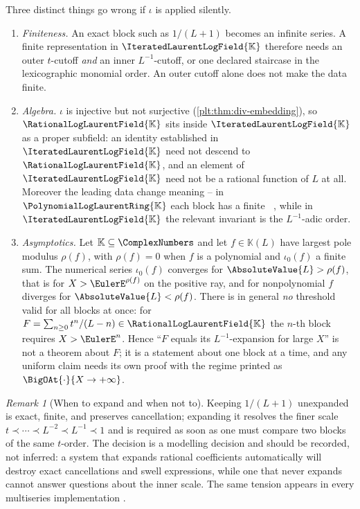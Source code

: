 \documentclass[11pt,oneside]{article}
\theoremstyle{plain}
\theoremstyle{definition}
\theoremstyle{remark}
\newtheorem{remark}[theorem]{Remark}
\newcommand{\K}{\mathbb{K}}
\newcommand{\PLlau}{\PolynomialLogLaurentRing{\K}}       %
\newcommand{\PLrat}{\RationalLogLaurentField{\K}}        %
\newcommand{\PLit}{\IteratedLaurentLogField{\K}}         %
\DeclareMathOperator{\degL}{deg_{L}}
\newcommand{\precdom}{\prec}
\begin{document}
\begin{warningbox}[title={Expanding at \(L=\infty\) changes the object}]
\label{plt:rmk:div-embedding-warning}
Three distinct things go wrong if \(\iota\) is applied silently.
\begin{enumerate}
\item \emph{Finiteness.}  An exact block such as \(1/(L+1)\) becomes an
      infinite series.  A finite representation in \(\PLit\) therefore needs an
      outer \(t\)-cutoff \emph{and} an inner \(L^{-1}\)-cutoff, or one declared
      staircase in the lexicographic monomial order.  An outer cutoff alone
      does not make the data finite.
\item \emph{Algebra.}  \(\iota\) is injective but not surjective
      (\cref{plt:thm:div-embedding}), so \(\PLrat\) sits inside \(\PLit\) as a
      proper subfield: an identity established in \(\PLit\) need not descend to
      \(\PLrat\), and an element of \(\PLit\) need not be a rational function
      of \(L\) at all.  Moreover the leading data change meaning -- in
      \(\PLlau\) each block has a finite \(\degL\), while in \(\PLit\) the
      relevant invariant is the \(L^{-1}\)-adic order.
\item \emph{Asymptotics.}  Let \(\K\subseteq\ComplexNumbers\) and let
      \(f\in\K(L)\) have largest pole modulus \(\rho(f)\), with
      \(\rho(f)=0\) when \(f\) is a polynomial and \(\iota_{0}(f)\) a finite
      sum.  The numerical series \(\iota_{0}(f)\) converges for
      \(\AbsoluteValue{L}>\rho(f)\), that is for \(X>\EulerE^{\rho(f)}\) on the
      positive ray, and for nonpolynomial \(f\) diverges for
      \(\AbsoluteValue{L}<\rho(f)\).  There is in general \emph{no} threshold
      valid for all blocks at once: for
      \(F=\sum_{n\ge0}t^{n}/(L-n)\in\PLrat\) the \(n\)-th block requires
      \(X>\EulerE^{n}\).  Hence ``\(F\) equals its \(L^{-1}\)-expansion for
      large \(X\)'' is not a theorem about \(F\); it is a statement about one
      block at a time, and any uniform claim needs its own proof with the
      regime printed as \(\BigOAt{\cdot}{X\to+\infty}\).
\end{enumerate}
\end{warningbox}

\begin{remark}[When to expand and when not to]
Keeping \(1/(L+1)\) unexpanded is exact, finite, and preserves cancellation;
expanding it resolves the finer scale
\(t\precdom\cdots\precdom L^{-2}\precdom L^{-1}\precdom1\) and is required as
soon as one must compare two blocks of the same \(t\)-order.  The decision is a
modelling decision and should be recorded, not inferred: a system that expands
rational coefficients automatically will destroy exact cancellations and swell
expressions, while one that never expands cannot answer questions about the
inner scale.  The same tension appears in every multiseries implementation
\cite{salvy-shackell-1998,salvy-shackell-1999}.
\end{remark}
\end{document}
